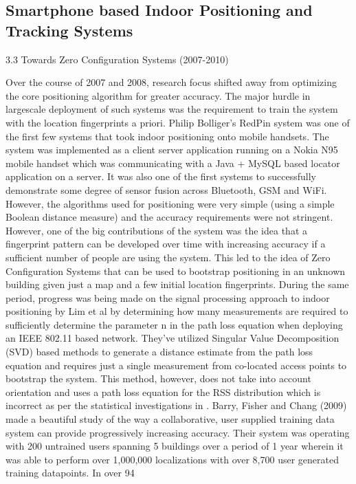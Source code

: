 \subsection{Smartphone based Indoor Positioning and Tracking Systems}





3.3 Towards Zero Configuration Systems (2007-2010)

Over the course of 2007 and 2008, research focus shifted away from optimizing the core positioning algorithm for greater accuracy. The major hurdle in largescale deployment of such systems was the requirement to train the system with the location fingerprints a priori. 
Philip Bolliger’s RedPin system  was one of the first few systems that took indoor positioning onto mobile handsets. The system was implemented as a client server application running on a Nokia N95 mobile handset which was communicating with a Java + MySQL based locator application on a server. It was also one of the first systems to successfully demonstrate some degree of sensor fusion across Bluetooth, GSM and WiFi. However, the algorithms used for positioning were very simple (using a simple Boolean distance measure) and the accuracy requirements were not stringent. However, one of the big contributions of the system was the idea that a fingerprint pattern can be developed over time with increasing accuracy if a sufficient number of people are using the system. This led to the idea of Zero Configuration Systems that can be used to bootstrap positioning in an unknown building given just a map and a few initial location fingerprints.
During the same period, progress was being made on the signal processing approach to indoor positioning by Lim et al by determining how many measurements are required to sufficiently determine the parameter n in the path loss equation when deploying an IEEE 802.11 based network. They’ve utilized Singular Value Decomposition (SVD) based methods to generate a distance estimate from the path loss equation and requires just a single measurement from co-located access points to bootstrap the system. This method, however, does not take into account orientation and uses a path loss equation for the RSS distribution which is incorrect as per the statistical investigations in .
Barry, Fisher and Chang (2009)  made a beautiful study of the way a collaborative, user supplied training data system can provide progressively increasing accuracy. Their system was operating with 200 untrained users spanning 5 buildings over a period of 1 year wherein it was able to perform over 1,000,000 localizations with over 8,700 user generated training datapoints. In over 94%

